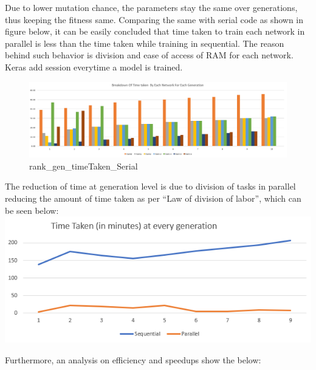 \documentclass[]{article}
\begin{document}
Due to lower mutation chance, the parameters stay the same over
generations, thus keeping the fitness same. Comparing the same with
serial code as shown in figure below, it can be easily concluded that
time taken to train each network in parallel is less than the time taken
while training in sequential. The reason behind such behavior is
division and ease of access of RAM for each network. Keras add session
everytime a model is trained.

\begin{figure}[htbp]
\centering
\includegraphics{./Images/Multiple-deme/rank_gen_timeTaken_Serial.PNG}
\caption{rank\_gen\_timeTaken\_Serial}
\end{figure}

The reduction of time at generation level is due to division of tasks in
parallel reducing the amount of time taken as per ``Law of division of
labor'', which can be seen below:
\includegraphics{./Images/Multiple-deme/timeS_vs_P.PNG}

Furthermore, an analysis on efficiency and speedups show the below:
\end{document}
